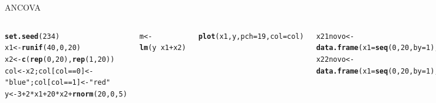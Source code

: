 \documentclass{beamer}\usepackage[]{graphicx}\usepackage[]{color}
\makeatletter
\newcommand{\hlnum}[1]{\textcolor[rgb]{0.686,0.059,0.569}{#1}}%
\newcommand{\hlstr}[1]{\textcolor[rgb]{0.192,0.494,0.8}{#1}}%
\newcommand{\hlopt}[1]{\textcolor[rgb]{0,0,0}{#1}}%
\newcommand{\hlstd}[1]{\textcolor[rgb]{0.345,0.345,0.345}{#1}}%
\newcommand{\hlkwb}[1]{\textcolor[rgb]{0.69,0.353,0.396}{#1}}%
\newcommand{\hlkwc}[1]{\textcolor[rgb]{0.333,0.667,0.333}{#1}}%
\newcommand{\hlkwd}[1]{\textcolor[rgb]{0.737,0.353,0.396}{\textbf{#1}}}%
\newenvironment{kframe}{%
 \def\at@end@of@kframe{}%
 \ifinner\ifhmode%
  \def\at@end@of@kframe{\end{minipage}}%
  \begin{minipage}{\columnwidth}%
 \fi\fi%
 \def\FrameCommand##1{\hskip\@totalleftmargin \hskip-\fboxsep
 \colorbox{shadecolor}{##1}\hskip-\fboxsep
     \hskip-\linewidth \hskip-\@totalleftmargin \hskip\columnwidth}%
 \MakeFramed {\advance\hsize-\width
   \@totalleftmargin\z@ \linewidth\hsize
   \@setminipage}}%
 {\par\unskip\endMakeFramed%
 \at@end@of@kframe}
\newenvironment{knitrout}{}{} %
\renewenvironment{knitrout}{\setlength{\topsep}{0mm}}{}
\makeatother
\begin{document}
\begin{frame}[fragile]{ANCOVA}

\begin{columns}

\setlength{\topsep}{2pt}
\begin{knitrout}\tiny
{}\color{fgcolor}\begin{kframe}
\begin{alltt}
\hlkwd{set.seed}\hlstd{(}\hlnum{234}\hlstd{)}
\hlstd{x1} \hlkwb{<-} \hlkwd{runif}\hlstd{(}\hlnum{40}\hlstd{,}\hlnum{0}\hlstd{,}\hlnum{20}\hlstd{)}
\hlstd{x2} \hlkwb{<-} \hlkwd{c}\hlstd{(}\hlkwd{rep}\hlstd{(}\hlnum{0}\hlstd{,}\hlnum{20}\hlstd{),}\hlkwd{rep}\hlstd{(}\hlnum{1}\hlstd{,}\hlnum{20}\hlstd{))}
\hlstd{col} \hlkwb{<-} \hlstd{x2; col[col}\hlopt{==}\hlnum{0}\hlstd{]} \hlkwb{<-} \hlstr{"blue"}\hlstd{; col[col}\hlopt{==}\hlnum{1}\hlstd{]} \hlkwb{<-} \hlstr{"red"}
\hlstd{y} \hlkwb{<-} \hlnum{3} \hlopt{+} \hlnum{2}\hlopt{*}\hlstd{x1} \hlopt{+} \hlnum{20}\hlopt{*}\hlstd{x2} \hlopt{+} \hlkwd{rnorm}\hlstd{(}\hlnum{20}\hlstd{,}\hlnum{0}\hlstd{,}\hlnum{5}\hlstd{)}

\hlstd{m} \hlkwb{<-} \hlkwd{lm}\hlstd{(y} \hlopt{~} \hlstd{x1} \hlopt{+} \hlstd{x2)}

\hlkwd{plot}\hlstd{(x1,y,} \hlkwc{pch}\hlstd{=}\hlnum{19}\hlstd{,}\hlkwc{col}\hlstd{=col)}

\hlstd{x21novo} \hlkwb{<-} \hlkwd{data.frame}\hlstd{(}\hlkwc{x1} \hlstd{=} \hlkwd{seq}\hlstd{(}\hlnum{0}\hlstd{,}\hlnum{20}\hlstd{,}\hlkwc{by}\hlstd{=}\hlnum{1}\hlstd{),} \hlkwc{x2}\hlstd{=}\hlkwd{rep}\hlstd{(}\hlnum{0}\hlstd{,}\hlnum{21}\hlstd{))}
\hlstd{x22novo} \hlkwb{<-} \hlkwd{data.frame}\hlstd{(}\hlkwc{x1} \hlstd{=} \hlkwd{seq}\hlstd{(}\hlnum{0}\hlstd{,}\hlnum{20}\hlstd{,}\hlkwc{by}\hlstd{=}\hlnum{1}\hlstd{),} \hlkwc{x2}\hlstd{=}\hlkwd{rep}\hlstd{(}\hlnum{1}\hlstd{,}\hlnum{21}\hlstd{))}

\hlstd{p1} \hlkwb{<-} \hlkwd{predict}\hlstd{(m,x21novo)}
\hlstd{p2} \hlkwb{<-} \hlkwd{predict}\hlstd{(m,x22novo)}

\hlkwd{lines}\hlstd{(}\hlkwd{seq}\hlstd{(}\hlnum{0}\hlstd{,}\hlnum{20}\hlstd{,}\hlkwc{by}\hlstd{=}\hlnum{1}\hlstd{),p1,} \hlkwc{lwd}\hlstd{=}\hlnum{2}\hlstd{,}\hlkwc{col}\hlstd{=}\hlstr{'blue'}\hlstd{)}
\hlkwd{lines}\hlstd{(}\hlkwd{seq}\hlstd{(}\hlnum{0}\hlstd{,}\hlnum{20}\hlstd{,}\hlkwc{by}\hlstd{=}\hlnum{1}\hlstd{),p2,} \hlkwc{lwd}\hlstd{=}\hlnum{2}\hlstd{,}\hlkwc{col}\hlstd{=}\hlstr{'red'}\hlstd{)}
\end{alltt}
\end{kframe}
\end{knitrout}


\end{columns}
\end{frame}
\end{document}
